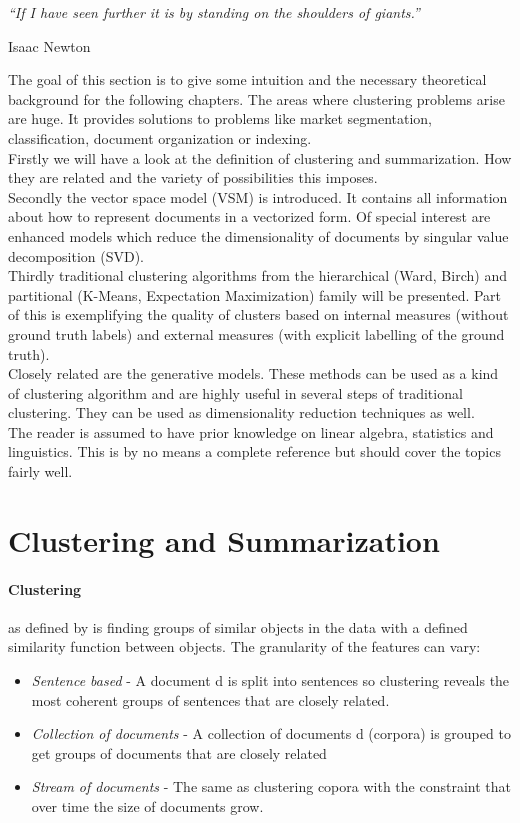 \epigraph{\emph{
  ``If I have seen further it is by standing on the shoulders of giants.''
}}{ Isaac Newton }

The goal of this section is to give some intuition and the necessary theoretical background for the following chapters. The areas where clustering problems arise are huge. It provides solutions to problems like market segmentation, classification, document organization or indexing.\\
Firstly we will have a look at the definition of clustering and summarization. How they are related and the variety of possibilities this imposes.\\
Secondly the vector space model (VSM) is introduced. It contains all information about how to represent documents in a vectorized form. Of special interest are enhanced models which reduce the dimensionality of documents by singular value decomposition (SVD).\\
Thirdly traditional clustering algorithms from the hierarchical (Ward, Birch) and partitional (K-Means, Expectation Maximization) family will be presented. Part of this is exemplifying the quality of clusters based on internal measures (without ground truth labels) and external measures (with explicit labelling of the ground truth).\\
Closely related are the generative models. These methods can be used as a kind of clustering algorithm and are highly useful in several steps of traditional clustering. They can be used as dimensionality reduction techniques as well.\\
The reader is assumed to have prior knowledge on linear algebra, statistics and linguistics. This is by no means a complete reference but should cover the topics fairly well.\\


\section{Clustering and Summarization}
  
  \paragraph{Clustering} as defined by \cite{ClusterAlgoSurveyIBM} is finding groups of similar objects in the data with a defined similarity function between objects. The granularity of the features can vary:

  \begin{itemize}
    \item \emph{Sentence based} - A document d is split into sentences so clustering reveals the most coherent groups of sentences that are closely related.
    \item \emph{Collection of documents} - A collection of documents d (corpora) is grouped to get groups of documents that are closely related
    \item \emph{Stream of documents} - The same as clustering copora with the constraint that over time the size of documents grow.
  \end{itemize}

